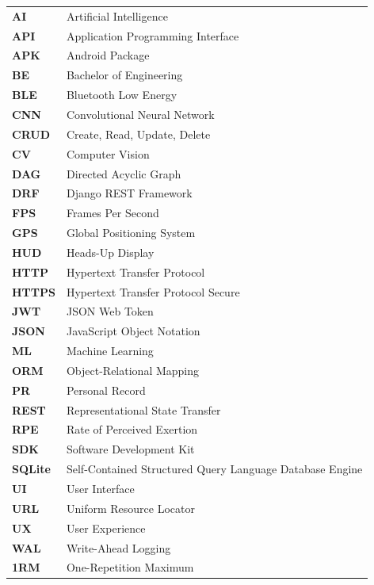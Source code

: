\documentclass[12pt,a4paper]{report}
\begin{document}
\begin{tabular}{lp{12cm}}
\textbf{AI} & Artificial Intelligence \\
\textbf{API} & Application Programming Interface \\
\textbf{APK} & Android Package \\
\textbf{BE} & Bachelor of Engineering \\
\textbf{BLE} & Bluetooth Low Energy \\
\textbf{CNN} & Convolutional Neural Network \\
\textbf{CRUD} & Create, Read, Update, Delete \\
\textbf{CV} & Computer Vision \\
\textbf{DAG} & Directed Acyclic Graph \\
\textbf{DRF} & Django REST Framework \\
\textbf{FPS} & Frames Per Second \\
\textbf{GPS} & Global Positioning System \\
\textbf{HUD} & Heads-Up Display \\
\textbf{HTTP} & Hypertext Transfer Protocol \\
\textbf{HTTPS} & Hypertext Transfer Protocol Secure \\
\textbf{JWT} & JSON Web Token \\
\textbf{JSON} & JavaScript Object Notation \\
\textbf{ML} & Machine Learning \\
\textbf{ORM} & Object-Relational Mapping \\
\textbf{PR} & Personal Record \\
\textbf{REST} & Representational State Transfer \\
\textbf{RPE} & Rate of Perceived Exertion \\
\textbf{SDK} & Software Development Kit \\
\textbf{SQLite} & Self-Contained Structured Query Language Database Engine \\
\textbf{UI} & User Interface \\
\textbf{URL} & Uniform Resource Locator \\
\textbf{UX} & User Experience \\
\textbf{WAL} & Write-Ahead Logging \\
\textbf{1RM} & One-Repetition Maximum \\
\end{tabular}

\newpage

\end{document}
